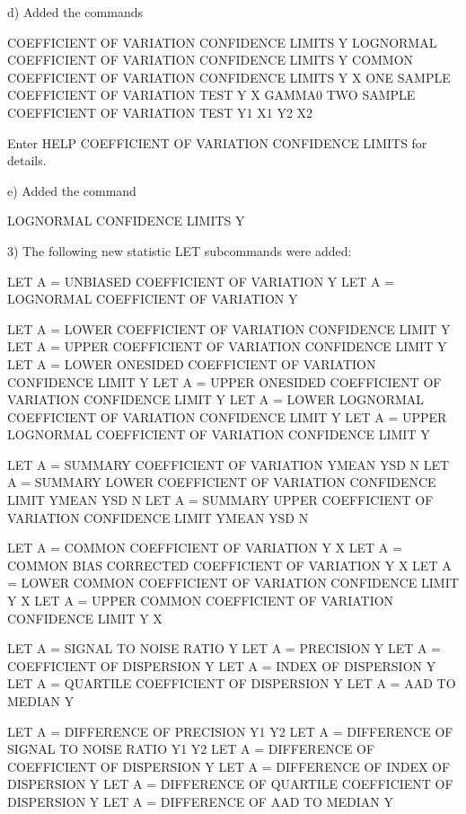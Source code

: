     d) Added the commands

           COEFFICIENT OF VARIATION CONFIDENCE LIMITS Y
           LOGNORMAL COEFFICIENT OF VARIATION CONFIDENCE LIMITS Y
           COMMON COEFFICIENT OF VARIATION CONFIDENCE LIMITS Y X
           ONE SAMPLE COEFFICIENT OF VARIATION TEST Y X GAMMA0
           TWO SAMPLE COEFFICIENT OF VARIATION TEST Y1 X1 Y2 X2

       Enter HELP COEFFICIENT OF VARIATION CONFIDENCE LIMITS for
       details.

    e) Added the command

           LOGNORMAL CONFIDENCE LIMITS Y

 3) The following new statistic LET subcommands were added:

       LET A = UNBIASED COEFFICIENT OF VARIATION Y
       LET A = LOGNORMAL COEFFICIENT OF VARIATION Y

       LET A = LOWER COEFFICIENT OF VARIATION CONFIDENCE LIMIT Y
       LET A = UPPER COEFFICIENT OF VARIATION CONFIDENCE LIMIT Y
       LET A = LOWER ONESIDED COEFFICIENT OF VARIATION CONFIDENCE LIMIT Y
       LET A = UPPER ONESIDED COEFFICIENT OF VARIATION CONFIDENCE LIMIT Y
       LET A = LOWER LOGNORMAL COEFFICIENT OF VARIATION CONFIDENCE LIMIT Y
       LET A = UPPER LOGNORMAL COEFFICIENT OF VARIATION CONFIDENCE LIMIT Y

       LET A = SUMMARY COEFFICIENT OF VARIATION YMEAN YSD N
       LET A = SUMMARY LOWER COEFFICIENT OF VARIATION CONFIDENCE LIMIT
               YMEAN YSD N
       LET A = SUMMARY UPPER COEFFICIENT OF VARIATION CONFIDENCE LIMIT
               YMEAN YSD N

       LET A = COMMON COEFFICIENT OF VARIATION Y X
       LET A = COMMON BIAS CORRECTED COEFFICIENT OF VARIATION Y X
       LET A = LOWER COMMON COEFFICIENT OF VARIATION CONFIDENCE LIMIT Y X
       LET A = UPPER COMMON COEFFICIENT OF VARIATION CONFIDENCE LIMIT Y X

       LET A = SIGNAL TO NOISE RATIO Y
       LET A = PRECISION Y
       LET A = COEFFICIENT OF DISPERSION Y
       LET A = INDEX OF DISPERSION Y
       LET A = QUARTILE COEFFICIENT OF DISPERSION Y
       LET A = AAD TO MEDIAN Y

       LET A = DIFFERENCE OF PRECISION Y1 Y2
       LET A = DIFFERENCE OF SIGNAL TO NOISE RATIO Y1 Y2
       LET A = DIFFERENCE OF COEFFICIENT OF DISPERSION Y
       LET A = DIFFERENCE OF INDEX OF DISPERSION Y
       LET A = DIFFERENCE OF QUARTILE COEFFICIENT OF DISPERSION Y
       LET A = DIFFERENCE OF AAD TO MEDIAN Y

